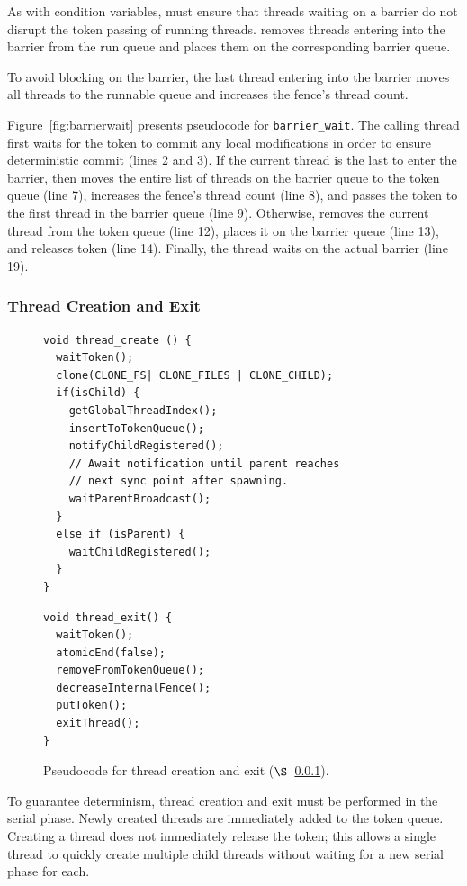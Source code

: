 As with condition variables, \dthreads{} must ensure that threads
waiting on a barrier do not disrupt the token passing of running
threads. \dthreads{} removes threads entering into the barrier from
the run queue and places them on the corresponding barrier queue.

To avoid blocking on the barrier, the last thread entering into
the barrier moves all threads to the runnable queue and increases
the fence's thread count.

Figure~\ref{fig:barrierwait} presents pseudocode
for \texttt{barrier\_wait}. The calling thread first waits for the
token to commit any local modifications in order to ensure
deterministic commit (lines 2 and 3). If the current thread is the
last to enter the barrier, then \dthreads{} moves the entire list of
threads on the barrier queue to the token queue (line 7), increases
the fence's thread count (line 8), and passes the token to the first thread in the
barrier queue (line 9).  Otherwise, \dthreads{} removes the current
thread from the token queue (line 12), places it on the barrier queue
(line 13), and releases token (line 14). Finally, the thread waits on
the actual barrier (line 19).

\subsubsection{Thread Creation and Exit}

\label{sec:threadcreation}

\begin{figure}
\begin{lstlisting}
void thread_create () {
  waitToken();
  clone(CLONE_FS| CLONE_FILES | CLONE_CHILD);
  if(isChild) {
    getGlobalThreadIndex();
	insertToTokenQueue();
	notifyChildRegistered();
	// Await notification until parent reaches 
    // next sync point after spawning.
	waitParentBroadcast();	
  }
  else if (isParent) {
	waitChildRegistered();
  }
}
\end{lstlisting}
\begin{lstlisting}
void thread_exit() {
  waitToken();
  atomicEnd(false);
  removeFromTokenQueue();
  decreaseInternalFence();
  putToken();
  exitThread(); 
}
\end{lstlisting}
\caption{Pseudocode for thread creation and exit ($\S$~\ref{sec:threadcreation}).
\label{fig:threadcreation}
}
\end{figure}

To guarantee determinism, thread creation and exit must be performed in the serial phase.  Newly created threads are immediately added to the token queue.  Creating a thread does not immediately release the token; this allows a single thread to quickly create multiple child threads without waiting for a new serial phase for each.

